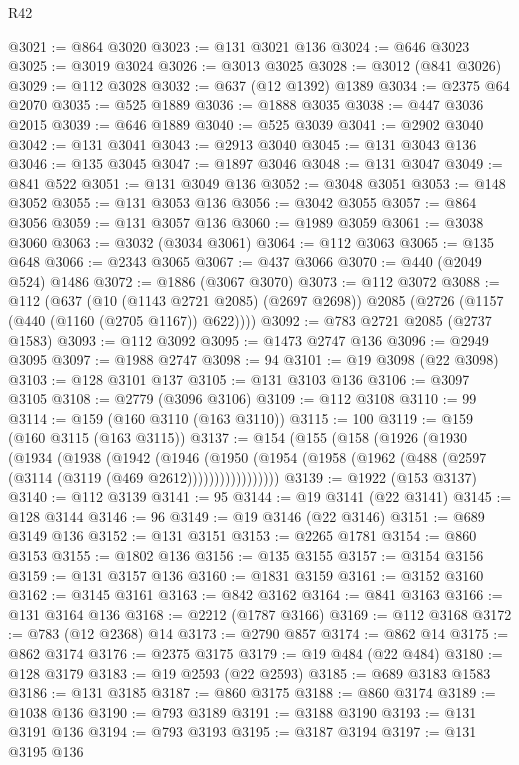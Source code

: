 \begin{lexlean}{R42}
\begin{coremodule}
@3021 := @864 @3020
@3023 := @131 @3021 @136
@3024 := @646 @3023
@3025 := @3019 @3024
@3026 := @3013 @3025
@3028 := @3012 (@841 @3026)
@3029 := @112 @3028
@3032 := @637 (@12 @1392) @1389
@3034 := @2375 @64 @2070
@3035 := @525 @1889
@3036 := @1888 @3035
@3038 := @447 @3036 @2015
@3039 := @646 @1889
@3040 := @525 @3039
@3041 := @2902 @3040
@3042 := @131 @3041
@3043 := @2913 @3040
@3045 := @131 @3043 @136
@3046 := @135 @3045
@3047 := @1897 @3046
@3048 := @131 @3047
@3049 := @841 @522
@3051 := @131 @3049 @136
@3052 := @3048 @3051
@3053 := @148 @3052
@3055 := @131 @3053 @136
@3056 := @3042 @3055
@3057 := @864 @3056
@3059 := @131 @3057 @136
@3060 := @1989 @3059
@3061 := @3038 @3060
@3063 := @3032 (@3034 @3061)
@3064 := @112 @3063
@3065 := @135 @648
@3066 := @2343 @3065
@3067 := @437 @3066
@3070 := @440 (@2049 @524) @1486
@3072 := @1886 (@3067 @3070)
@3073 := @112 @3072
@3088 := @112
    (@637
      (@10 (@1143 @2721 @2085) (@2697 @2698))
      @2085
      (@2726 (@1157 (@440 (@1160 (@2705 @1167)) @622))))
@3092 := @783 @2721 @2085 (@2737 @1583)
@3093 := @112 @3092
@3095 := @1473 @2747 @136
@3096 := @2949 @3095
@3097 := @1988 @2747
@3098 := 94
@3101 := @19 @3098 (@22 @3098)
@3103 := @128 @3101 @137
@3105 := @131 @3103 @136
@3106 := @3097 @3105
@3108 := @2779 (@3096 @3106)
@3109 := @112 @3108
@3110 := 99
@3114 := @159 (@160 @3110 (@163 @3110))
@3115 := 100
@3119 := @159 (@160 @3115 (@163 @3115))
@3137 := @154
    (@155
      (@158
        (@1926
          (@1930
            (@1934
              (@1938
                (@1942
                  (@1946
                    (@1950
                      (@1954 (@1958 (@1962 (@488 (@2597 (@3114 (@3119 (@469 @2612)))))))))))))))))
@3139 := @1922 (@153 @3137)
@3140 := @112 @3139
@3141 := 95
@3144 := @19 @3141 (@22 @3141)
@3145 := @128 @3144
@3146 := 96
@3149 := @19 @3146 (@22 @3146)
@3151 := @689 @3149 @136
@3152 := @131 @3151
@3153 := @2265 @1781
@3154 := @860 @3153
@3155 := @1802 @136
@3156 := @135 @3155
@3157 := @3154 @3156
@3159 := @131 @3157 @136
@3160 := @1831 @3159
@3161 := @3152 @3160
@3162 := @3145 @3161
@3163 := @842 @3162
@3164 := @841 @3163
@3166 := @131 @3164 @136
@3168 := @2212 (@1787 @3166)
@3169 := @112 @3168
@3172 := @783 (@12 @2368) @14
@3173 := @2790 @857
@3174 := @862 @14
@3175 := @862 @3174
@3176 := @2375 @3175
@3179 := @19 @484 (@22 @484)
@3180 := @128 @3179
@3183 := @19 @2593 (@22 @2593)
@3185 := @689 @3183 @1583
@3186 := @131 @3185
@3187 := @860 @3175
@3188 := @860 @3174
@3189 := @1038 @136
@3190 := @793 @3189
@3191 := @3188 @3190
@3193 := @131 @3191 @136
@3194 := @793 @3193
@3195 := @3187 @3194
@3197 := @131 @3195 @136

\end{coremodule}
\end{lexlean}
